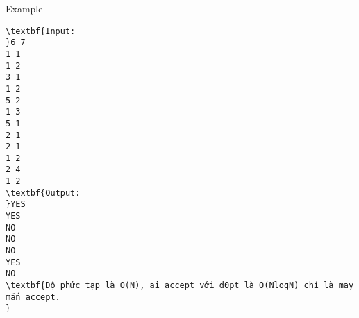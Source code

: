Example
\begin{verbatim}
\textbf{Input:
}6 7
1 1
1 2
3 1
1 2
5 2
1 3
5 1
2 1
2 1
1 2
2 4
1 2
\textbf{Output: 
}YES
YES
NO
NO
NO
YES
NO
\textbf{Độ phức tạp là O(N), ai accept với d0pt là O(NlogN) chỉ là may mắn accept.
}\end{verbatim}